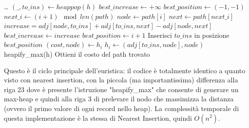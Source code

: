 \documentclass[a4paper,12pt]{report}
\begin{document}
\begin{tcolorbox}[colframe=black, colback=white, boxrule=0.5pt, title=Farthest Insertion, coltitle=black, fonttitle=\bfseries, colbacktitle=white, breakable]
  \begin{algorithmic}[1]
    \State \dots
      \State $(\_, to\_ins) \gets heappop(h)$
      \State $best\_increase \gets +\infty$
      \State $best\_position \gets (-1, -1)$
      \State $next\_i \gets (i + 1) \mod len(path)$
      \State $node \gets path[i]$
      \State $next \gets path[next\_i]$
      \State $increase = adj[node, to\_ins] + adj[to\_ins, next] - adj[node, next]$
        \State $best\_increase \gets increase$
        \State $best\_position \gets i + 1$
      \EndIf
    \EndFor
    \State Inserisci $to\_ins$ in posizione $best\_position$
      \State $(cost, node) \gets h_i$
        \State $h_i \gets (adj[to\_ins, node], node)$
      \EndIf
    \EndFor
    \State heapify\_max(h)
  \EndWhile
  \State Ottieni il costo del path trovato
  \end{algorithmic}
\end{tcolorbox}
Questo è il ciclo principale dell'euristica: il codice è totalmente identico a quanto visto con nearest insertion, con la piccola (ma importantissima) differenza alla riga 23 dove è presente l'istruzione "heapify\_max" che consente di generare un max-heap e quindi alla riga 3 di prelevare il nodo che massimizza la distanza (ovvero il primo valore di ogni record nello heap). \newline
La complessità temporale di questa implementazione è la stessa di Nearest Insertion, quindi $O(n^2)$.
\end{document}
